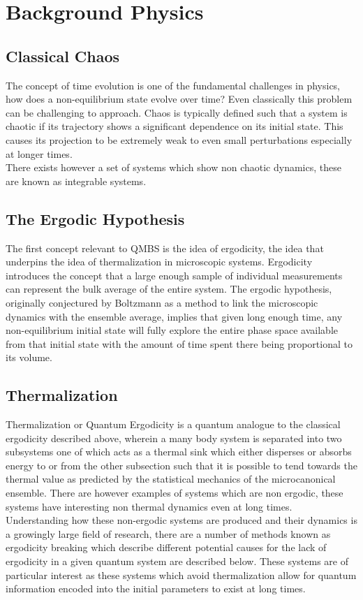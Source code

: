 \chapter{Background Physics	}

\section{Classical Chaos}
The concept of time evolution is one of the fundamental challenges in physics, how does a non-equilibrium state evolve over time? Even classically this problem can be challenging to approach. Chaos is typically defined such that a system is chaotic if its trajectory shows a significant dependence on its initial state. This causes its projection to be extremely weak to even small perturbations especially at longer times. \\
There exists however a set of systems which show non chaotic dynamics, these are known as integrable systems. \cite{dalessio_chaos}

\section{The Ergodic Hypothesis}
The first concept relevant to QMBS is the idea of ergodicity, the idea that underpins the idea of thermalization in microscopic systems. Ergodicity introduces the concept that a large enough sample of individual measurements can represent the bulk average of the entire system. 
The ergodic hypothesis, originally conjectured by Boltzmann as a method to link the microscopic dynamics with the ensemble average, implies that given long enough time, any non-equilibrium initial state will fully explore the entire phase space available from that initial state with the amount of time spent there being proportional to its volume. \\
\section{Thermalization}
Thermalization or Quantum Ergodicity is a quantum analogue to the classical ergodicity described above, wherein a many body system is separated into two subsystems one of which acts as a thermal sink which either disperses or absorbs energy to or from the other subsection such that it is possible to tend towards the thermal value as predicted by the statistical mechanics of the microcanonical ensemble. There are however examples of systems which are non ergodic, these systems have interesting non thermal dynamics even at long times. Understanding how these non-ergodic systems are produced and their dynamics is a growingly large field of research, there are a number of methods known as ergodicity breaking which describe different potential causes for the lack of ergodicity in a given quantum system are described below. These systems are of particular interest as these systems which avoid thermalization allow for quantum information encoded into the initial parameters to exist at long times. 
